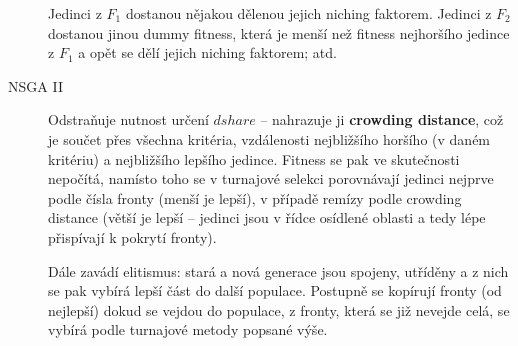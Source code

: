 \begin{description}
	Jedinci z $F_1$ dostanou nějakou  dělenou jejich niching faktorem. Jedinci z $F_2$ dostanou jinou dummy fitness, která je menší než fitness nejhoršího jedince z $F_1$ a opět se dělí jejich niching faktorem; atd.
	
	\item[NSGA II] Odstraňuje nutnost určení $dshare$ -- nahrazuje ji \textbf{crowding distance}, což je součet přes všechna kritéria, vzdálenosti nejbližšího horšího (v daném kritériu) a nejbližšího lepšího jedince. Fitness se pak ve skutečnosti nepočítá, namísto toho se v turnajové selekci porovnávají jedinci nejprve podle čísla fronty (menší je lepší), v případě remízy podle crowding distance (větší je lepší -- jedinci jsou v řídce osídlené oblasti a tedy lépe přispívají k pokrytí fronty).
	
	Dále zavádí elitismus: stará a nová generace jsou spojeny, utříděny a z nich se pak vybírá lepší část do další populace. Postupně se kopírují fronty (od nejlepší) dokud se vejdou do populace, z fronty, která se již nevejde celá, se vybírá podle turnajové metody popsané výše.
	
\end{description}

